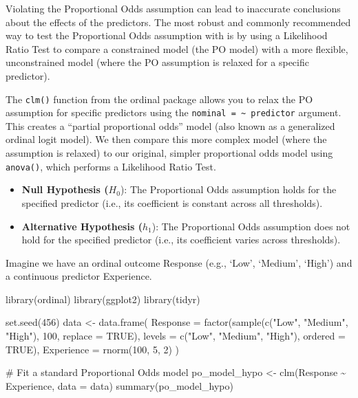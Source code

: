 \documentclass[
  letterpaper,
  DIV=11,
  numbers=noendperiod]{scrartcl}
\newenvironment{Shaded}{\begin{snugshade}}{\end{snugshade}}
\newcommand{\AttributeTok}[1]{\textcolor[rgb]{0.40,0.45,0.13}{#1}}
\newcommand{\CommentTok}[1]{\textcolor[rgb]{0.37,0.37,0.37}{#1}}
\newcommand{\ConstantTok}[1]{\textcolor[rgb]{0.56,0.35,0.01}{#1}}
\newcommand{\DecValTok}[1]{\textcolor[rgb]{0.68,0.00,0.00}{#1}}
\newcommand{\FunctionTok}[1]{\textcolor[rgb]{0.28,0.35,0.67}{#1}}
\newcommand{\NormalTok}[1]{\textcolor[rgb]{0.00,0.23,0.31}{#1}}
\newcommand{\OtherTok}[1]{\textcolor[rgb]{0.00,0.23,0.31}{#1}}
\newcommand{\SpecialCharTok}[1]{\textcolor[rgb]{0.37,0.37,0.37}{#1}}
\newcommand{\StringTok}[1]{\textcolor[rgb]{0.13,0.47,0.30}{#1}}
\begin{document}
Violating the Proportional Odds assumption can lead to inaccurate
conclusions about the effects of the predictors. The most robust and
commonly recommended way to test the Proportional Odds assumption with
is by using a Likelihood Ratio Test to compare a constrained model (the
PO model) with a more flexible, unconstrained model (where the PO
assumption is relaxed for a specific predictor).

The \texttt{clm()} function from the ordinal package allows you to relax
the PO assumption for specific predictors using the
\texttt{nominal\ =\ \textasciitilde{}\ predictor} argument. This creates
a ``partial proportional odds'' model (also known as a generalized
ordinal logit model). We then compare this more complex model (where the
assumption is relaxed) to our original, simpler proportional odds model
using \texttt{anova()}, which performs a Likelihood Ratio Test.

\begin{itemize}
\item
  \textbf{Null Hypothesis (}\(H_0\)): The Proportional Odds assumption
  holds for the specified predictor (i.e., its coefficient is constant
  across all thresholds).
\item
  \textbf{Alternative Hypothesis (}\(h_1\)): The Proportional Odds
  assumption does not hold for the specified predictor (i.e., its
  coefficient varies across thresholds).
\end{itemize}

Imagine we have an ordinal outcome Response (e.g., `Low', `Medium',
`High') and a continuous predictor Experience.

\begin{Shaded}
\begin{Highlighting}[]
\FunctionTok{library}\NormalTok{(ordinal) }
\FunctionTok{library}\NormalTok{(ggplot2) }
\FunctionTok{library}\NormalTok{(tidyr)   }

\FunctionTok{set.seed}\NormalTok{(}\DecValTok{456}\NormalTok{)}
\NormalTok{data }\OtherTok{\textless{}{-}} \FunctionTok{data.frame}\NormalTok{(}
  \AttributeTok{Response =} \FunctionTok{factor}\NormalTok{(}\FunctionTok{sample}\NormalTok{(}\FunctionTok{c}\NormalTok{(}\StringTok{"Low"}\NormalTok{, }\StringTok{"Medium"}\NormalTok{, }\StringTok{"High"}\NormalTok{), }\DecValTok{100}\NormalTok{, }\AttributeTok{replace =} \ConstantTok{TRUE}\NormalTok{),}
                    \AttributeTok{levels =} \FunctionTok{c}\NormalTok{(}\StringTok{"Low"}\NormalTok{, }\StringTok{"Medium"}\NormalTok{, }\StringTok{"High"}\NormalTok{), }\AttributeTok{ordered =} \ConstantTok{TRUE}\NormalTok{),}
  \AttributeTok{Experience =} \FunctionTok{rnorm}\NormalTok{(}\DecValTok{100}\NormalTok{, }\DecValTok{5}\NormalTok{, }\DecValTok{2}\NormalTok{)}
\NormalTok{)}

\CommentTok{\# Fit a standard Proportional Odds model}
\NormalTok{po\_model\_hypo }\OtherTok{\textless{}{-}} \FunctionTok{clm}\NormalTok{(Response }\SpecialCharTok{\textasciitilde{}}\NormalTok{ Experience, }\AttributeTok{data =}\NormalTok{ data)}
\FunctionTok{summary}\NormalTok{(po\_model\_hypo)}
\end{Highlighting}
\end{Shaded}
\end{document}
